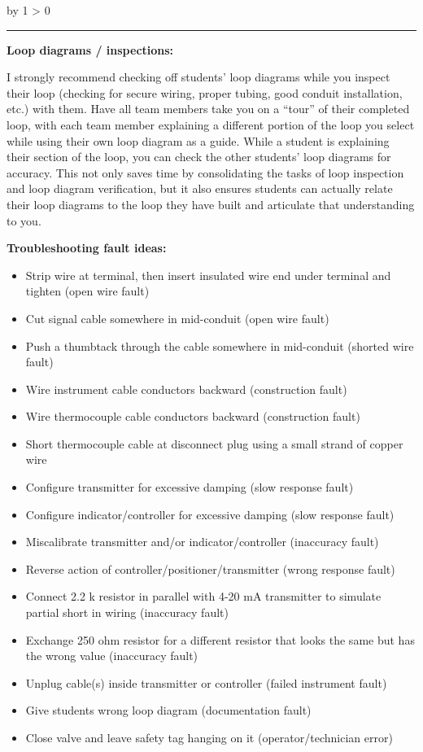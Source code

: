 \documentclass[12pt,a4paper]{article}
\def\notes{
           \advance\explnum by 1
           \ifnum \explnum > 0
                \hrule
                \vskip 3pt
                \leftline{Notes \the\explnum}
                \vskip 3pt \fi}
\begin{document}
\begin{itemize}
\notes{} 

\noindent
{\bf Loop diagrams / inspections:}

I strongly recommend checking off students' loop diagrams while you inspect their loop (checking for secure wiring, proper tubing, good conduit installation, etc.) with them.  Have all team members take you on a ``tour'' of their completed loop, with each team member explaining a different portion of the loop you select while using their own loop diagram as a guide.  While a student is explaining their section of the loop, you can check the other students' loop diagrams for accuracy.  This not only saves time by consolidating the tasks of loop inspection and loop diagram verification, but it also ensures students can actually relate their loop diagrams to the loop they have built and articulate that understanding to you.

\vskip 10pt

\goodbreak

\noindent
{\bf Troubleshooting fault ideas:}

\begin{itemize}
\item{} Strip wire at terminal, then insert insulated wire end under terminal and tighten (open wire fault)
\item{} Cut signal cable somewhere in mid-conduit (open wire fault)
\item{} Push a thumbtack through the cable somewhere in mid-conduit (shorted wire fault)
\item{} Wire instrument cable conductors backward (construction fault)
\item{} Wire thermocouple cable conductors backward (construction fault)
\item{} Short thermocouple cable at disconnect plug using a small strand of copper wire
\item{} Configure transmitter for excessive damping (slow response fault)
\item{} Configure indicator/controller for excessive damping (slow response fault)
\item{} Miscalibrate transmitter and/or indicator/controller (inaccuracy fault)
\item{} Reverse action of controller/positioner/transmitter (wrong response fault)
\item{} Connect 2.2 k resistor in parallel with 4-20 mA transmitter to simulate partial short in wiring (inaccuracy fault)
\item{} Exchange 250 ohm resistor for a different resistor that looks the same but has the wrong value (inaccuracy fault) 
\item{} Unplug cable(s) inside transmitter or controller (failed instrument fault)
\item{} Give students wrong loop diagram (documentation fault)
\item{} Close valve and leave safety tag hanging on it (operator/technician error)
\end{itemize}










\end{itemize}
\end{document}
